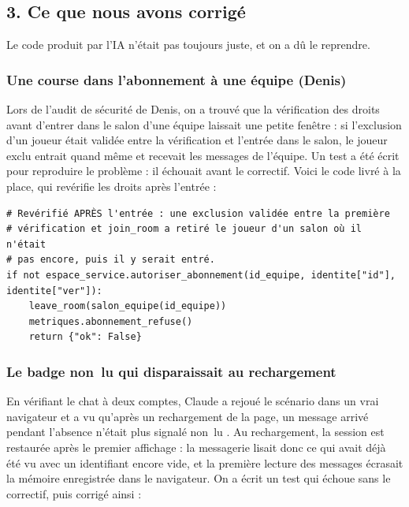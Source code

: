 \documentclass[11pt,a4paper]{article}
\begin{document}
\subsection*{3. Ce que nous avons corrigé}

Le code produit par l'IA n'était pas toujours juste, et on a dû le reprendre.

\subsubsection*{Une course dans l'abonnement à une équipe (Denis)}

Lors de l'audit de sécurité de Denis, on a trouvé que la vérification des droits avant d'entrer dans le salon d'une équipe laissait une petite fenêtre : si l'exclusion d'un joueur était validée entre la vérification et l'entrée dans le salon, le joueur exclu entrait quand même et recevait les messages de l'équipe. Un test a été écrit pour reproduire le problème : il échouait avant le correctif. Voici le code livré à la place, qui revérifie les droits après l'entrée :

\begin{blocode}
\begin{Verbatim}
# Revérifié APRÈS l'entrée : une exclusion validée entre la première
# vérification et join_room a retiré le joueur d'un salon où il n'était
# pas encore, puis il y serait entré.
if not espace_service.autoriser_abonnement(id_equipe, identite["id"], identite["ver"]):
    leave_room(salon_equipe(id_equipe))
    metriques.abonnement_refuse()
    return {"ok": False}
\end{Verbatim}
\end{blocode}

\subsubsection*{Le badge \og non~lu \fg{} qui disparaissait au rechargement}

En vérifiant le chat à deux comptes, Claude a rejoué le scénario dans un vrai navigateur et a vu qu'après un rechargement de la page, un message arrivé pendant l'absence n'était plus signalé \og non~lu \fg{}. Au rechargement, la session est restaurée après le premier affichage : la messagerie lisait donc ce qui avait déjà été vu avec un identifiant encore vide, et la première lecture des messages écrasait la mémoire enregistrée dans le navigateur. On a écrit un test qui échoue sans le correctif, puis corrigé ainsi :
\end{document}
